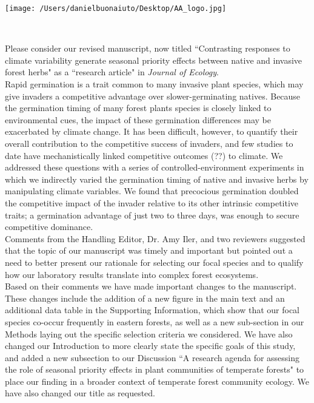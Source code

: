\documentclass[11 pt]{article}
\begin{document}

\def\labelitemi{--}
\parindent=24pt
\noindent\texttt{[image: /Users/danielbuonaiuto/Desktop/AA\_logo.jpg]}

\\
\vspace{1.5ex}

\noindent Please consider our revised manuscript, now titled ``Contrasting responses to climate variability generate seasonal priority effects between native and invasive forest herbs" as a ``research article" in \textit{Journal of Ecology}.\\

\noindent Rapid germination is  a trait common to many invasive plant species, which may give invaders a competitive advantage over slower-germinating natives. Because the germination timing of many forest plants species is closely linked to environmental cues, the impact of these germination differences may be exacerbated by climate change. It has been difficult, however, to quantify their overall contribution to the competitive success of invaders, and few studies to date have mechanistically linked competitive outcomes (??) to climate. We addressed these questions with a series of controlled-environment experiments in which we indirectly varied the germination timing of native and invasive herbs by manipulating climate variables. We found that precocious germination doubled the competitive impact of the invader relative to its other intrinsic competitive traits; a germination advantage of just two to three days, was enough to secure competitive dominance.\\

\noindent Comments from the Handling Editor, Dr. Amy Iler, and two reviewers suggested that the topic of our manuscript was timely and important but pointed out a need to better present our rationale for selecting our focal species and to qualify how our laboratory results translate into complex forest ecosystems.\\

\noindent Based on their comments we have made important changes to the manuscript. These changes include the addition of a new figure in the main text and an additional data table in the Supporting Information, which show that our focal species co-occur frequently in eastern forests, as well as a new sub-section in our Methods laying out the specific selection criteria we considered. We have also changed our Introduction to more clearly state the specific goals of this study, and added a new subsection to our Discussion ``A research agenda for assessing the role of seasonal priority effects in plant communities of temperate forests" to place our finding in a broader context of temperate forest community ecology. We have also changed our title as requested. \\ 
\end{document}
